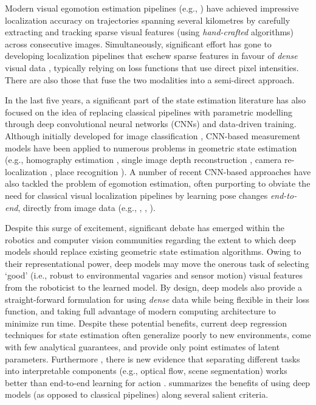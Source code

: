 Modern visual egomotion estimation pipelines (e.g., \cite{Leutenegger2015-fk, Cvisic2015-mt, Tsotsos2015-qs}) have achieved impressive localization accuracy on trajectories spanning several kilometres by carefully extracting and tracking sparse visual features (using \textit{hand-crafted} algorithms) across consecutive images. Simultaneously, significant effort has gone to developing localization pipelines that eschew sparse features in favour of  \textit{dense} visual data \citep{Alcantarilla2016-kv, Forster2014-bm}, typically relying on loss functions that use direct pixel intensities. There are also those that fuse the two \citep{Forster2014-bm} modalities into a semi-direct approach.


In the last five years, a significant part of the state estimation literature has also focused on the idea of replacing classical pipelines with parametric modelling through deep convolutional neural networks (CNNs) and data-driven training. Although initially developed for image classification  \citep{LeCun2015-qf}, CNN-based measurement models have been applied to numerous problems in geometric state estimation (e.g., homography estimation \citep{DeTone2016-ue}, single image depth reconstruction \citep{Garg2016-ip},  camera re-localization \citep{Kendall2016-zf}, place recognition \citep{Sunderhauf2015-is}). A number of recent CNN-based approaches have also tackled the problem of egomotion estimation, often purporting to obviate the need for classical visual localization pipelines by learning pose changes \textit{end-to-end}, directly from image data (e.g., \cite{Melekhov2017-dl}, \cite{Handa2016-hm}, \cite{Oliveira2017-lt}).

Despite this surge of excitement, significant debate has emerged within the robotics and computer vision communities regarding the extent to which deep models should replace existing geometric state estimation algorithms. Owing to their representational power, deep models may move the onerous task of selecting `good' (i.e., robust to environmental vagaries and sensor motion) visual features from the roboticist to the learned model. By design, deep models also provide a straight-forward formulation for using \textit{dense} data while being flexible in their loss function, and taking full advantage of modern computing architecture to minimize run time. Despite these potential benefits, current deep regression techniques for state estimation often generalize poorly to new environments, come with few analytical guarantees, and provide only point estimates of latent parameters. Furthermore , there is new evidence that separating different tasks into interpretable components (e.g., optical flow, scene segmentation) works better than end-to-end learning for action \citep{Zhou2019-se}.  summarizes the benefits of using deep models (as opposed to classical pipelines) along several salient criteria. 


